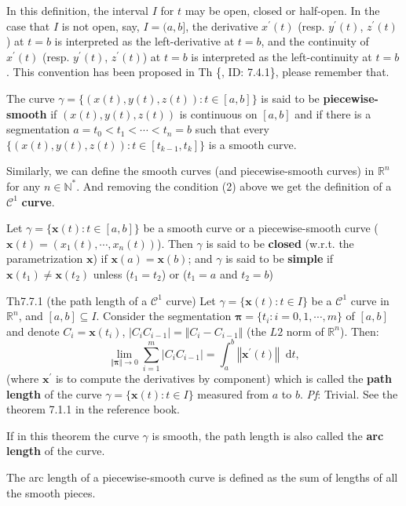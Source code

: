\documentclass{article}
\newcommand{\dif}{\mathop{}\!\mathrm{d}}
\begin{document}
\begin{Rmk}{}
    \begin{compactenum}
        \item In this definition, the interval $I$ for $t$ may be open, closed or half-open. In the case that $I$ is not open, say, $I = (a, b]$, the derivative $x^\prime(t)$ (resp. $y^\prime(t)$, $z^\prime(t)$) at $t = b$ is interpreted as the left-derivative at $t=b$, and the continuity of $x^\prime(t)$ (resp. $y^\prime(t)$, $z^\prime(t)$) at $t = b$ is interpreted as the left-continuity at $t=b$. This convention has been proposed in Th \{, ID: 7.4.1\}, please remember that.
        \item \textcolor{Df}{The curve $\gamma = \{(x(t), y(t), z(t)): t\in [a,b]\}$ is said to be \textbf{piecewise-smooth} if $(x(t), y(t), z(t))$ is continuous on $[a,b]$ and if there is a segmentation $a = t_0 < t_1 < \cdots < t_n = b$ such that every $\{(x(t), y(t), z(t)): t\in [t_{k-1}, t_{k}]\}$ is a smooth curve.}
        \item \textcolor{Df}{Similarly, we can define the smooth curves (and piecewise-smooth curves) in $\mathbb{R}^n$ for any $n\in\mathbb{N}^\ast$. And removing the condition (2) above we get the definition of a $\mathcal{C}^1$ \textbf{curve}.}
        \item \textcolor{Df}{Let $\gamma = \{\pmb{x}(t): t\in [a,b]\}$ be a smooth curve or a piecewise-smooth curve ($\pmb{x}(t) = (x_1(t), \cdots, x_n(t))$). Then $\gamma$ is said to be \textbf{closed} (w.r.t. the parametrization $\pmb{x}$) if $\pmb{x}(a) = \pmb{x}(b)$; and $\gamma$ is said to be \textbf{simple} if $\pmb{x}(t_1)\neq\pmb{x}(t_2)$ unless ($t_1 = t_2$) or ($t_1 = a$ and $t_2 = b$)}
    \end{compactenum}
\end{Rmk}

\begin{Th}{Th7.7.1 (the path length of a $\mathcal{C}^1$ curve)}
    Let $\gamma = \{\pmb{x}(t): t\in I\}$ be a $\mathcal{C}^1$ curve in $\mathbb{R}^n$, and $[a,b]\subseteq I$. Consider the segmentation $\pmb{\pi} = \{t_i: i = 0,1,\cdots,m\}$ of $[a, b]$ and denote $C_i = \pmb{x}(t_i)$, $|C_iC_{i-1}| = \Vert C_i - C_{i-1}\Vert$ (the $L2$ norm of $\mathbb{R}^n$). Then:
    $$\lim_{\Vert \pmb{\pi}\Vert\to 0}\sum_{i=1}^m |C_iC_{i-1}| = \int_a^b \left\Vert \pmb{x}^\prime(t) \right\Vert \dif t, $$
    \textcolor{Df}{(where $\pmb{x}^\prime$ is to compute the derivatives by component) which is called the \textbf{path length} of the curve $\gamma = \{\pmb{x}(t): t\in I\}$ measured from $a$ to $b$.}
    \tcblower
    \textit{Pf}: Trivial. See the theorem 7.1.1 in the reference book.
\end{Th}

\begin{Rmk}{}
    \begin{compactenum}
        \item \textcolor{Df}{If in this theorem the curve $\gamma$ is smooth, the path length is also called the \textbf{arc length} of the curve.}
        \item \textcolor{Df}{The arc length of a piecewise-smooth curve is defined as the sum of lengths of all the smooth pieces.}
    \end{compactenum}
\end{Rmk}
\end{document}
